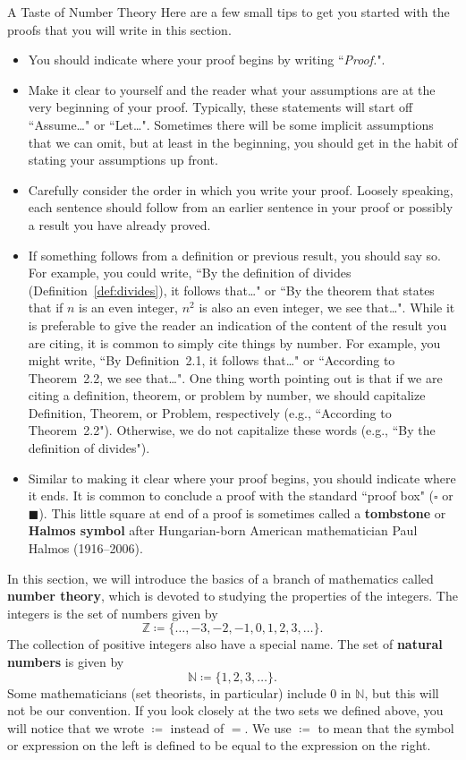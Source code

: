 \begin{section}{A Taste of Number Theory}
Here are a few small tips to get you started with the proofs that you will write in this section.
\begin{itemize}
\item You should indicate where your proof begins by writing ``\emph{Proof.}".
\item Make it clear to yourself and the reader what your assumptions are at the very beginning of your proof. Typically, these statements will start off ``Assume\ldots" or ``Let\ldots". Sometimes there will be some implicit assumptions that we can omit, but at least in the beginning, you should get in the habit of stating your assumptions up front. 
\item Carefully consider the order in which you write your proof. Loosely speaking, each sentence should follow from an earlier sentence in your proof or possibly a result you have already proved.
\item If something follows from a definition or previous result, you should say so.  For example, you could write, ``By the definition of divides (Definition~\ref{def:divides}), it follows that\ldots" or ``By the theorem that states that if $n$ is an even integer, $n^2$ is also an even integer, we see that\ldots". While it is preferable to give the reader an indication of the content of the result you are citing, it is common to simply cite things by number. For example, you might write, ``By Definition~2.1, it follows that\ldots" or ``According to Theorem~2.2, we see that\ldots".  One thing worth pointing out is that if we are citing a definition, theorem, or problem by number, we should capitalize Definition, Theorem, or Problem, respectively (e.g., ``According to Theorem~2.2"). Otherwise, we do not capitalize these words (e.g., ``By the definition of divides").
\item Similar to making it clear where your proof begins, you should indicate where it ends.  It is common to conclude a proof with the standard ``proof box" ($\square$ or $\blacksquare$).  This little square at end of a proof is sometimes called a \textbf{tombstone} or \textbf{Halmos symbol} after Hungarian-born American mathematician Paul Halmos (1916--2006).
\end{itemize}

In this section, we will introduce the basics of a branch of mathematics called \textbf{number theory}, which is devoted to studying the properties of the integers. The integers is the set of numbers given by
\[
\boxed{\mathbb{Z} \coloneqq  \{\ldots, -3, -2, -1, 0, 1, 2, 3, \ldots\}}.
\]
The collection of positive integers also have a special name.  The set of \textbf{natural numbers} is given by
\[
\boxed{\mathbb{N}\coloneqq \{1,2,3,\ldots\}}.
\]
Some mathematicians (set theorists, in particular) include $0$ in $\mathbb{N}$, but this will not be our convention. If you look closely at the two sets we defined above, you will notice that we wrote $\boxed{\coloneqq }$ instead of $=$.  We use $\coloneqq $ to mean that the symbol or expression on the left is defined to be equal to the expression on the right.


\end{section}
